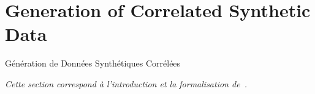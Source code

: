 %
%
%









\newpage



\section{Generation of Correlated Synthetic Data}{Génération de Données Synthétiques Corrélées}

\label{app:sec:syntheticdata}




\textit{Cette section correspond à l'introduction et la formalisation de~\cite{raimbault2016generation}.}

\stars

